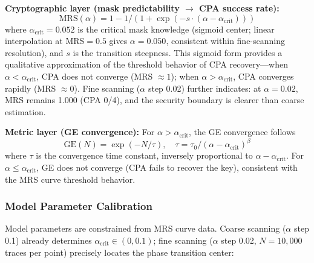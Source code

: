 \documentclass[journal]{IEEEtran}
\begin{document}
\textbf{Cryptographic layer (mask predictability $\rightarrow$ CPA success rate):}
\begin{equation}
\text{MRS}(\alpha) = 1 - 1/(1 + \exp(-s \cdot (\alpha - \alpha_{\text{crit}})))
\end{equation}
where $\alpha_{\text{crit}} = 0.052$ is the critical mask knowledge (sigmoid center; linear interpolation at MRS$=0.5$ gives $\alpha=0.050$, consistent within fine-scanning resolution), and $s$ is the transition steepness. This sigmoid form provides a qualitative approximation of the threshold behavior of CPA recovery---when $\alpha < \alpha_{\text{crit}}$, CPA does not converge (MRS $\approx 1$); when $\alpha > \alpha_{\text{crit}}$, CPA converges rapidly (MRS $\approx 0$). Fine scanning ($\alpha$ step 0.02) further indicates: at $\alpha=0.02$, MRS remains 1.000 (CPA 0/4), and the security boundary is clearer than coarse estimation.

\textbf{Metric layer (GE convergence):} For $\alpha > \alpha_{\text{crit}}$, the GE convergence follows
\begin{equation}
\text{GE}(N) = \exp(-N/\tau), \quad \tau = \tau_0 / (\alpha - \alpha_{\text{crit}})^\beta
\end{equation}
where $\tau$ is the convergence time constant, inversely proportional to $\alpha - \alpha_{\text{crit}}$. For $\alpha \le \alpha_{\text{crit}}$, GE does not converge (CPA fails to recover the key), consistent with the MRS curve threshold behavior.

\subsubsection{Model Parameter Calibration}

Model parameters are constrained from MRS curve data. Coarse scanning ($\alpha$ step 0.1) already determines $\alpha_{\text{crit}} \in (0, 0.1)$; fine scanning ($\alpha$ step 0.02, $N=10{,}000$ traces per point) precisely locates the phase transition center:

\begin{table}[t]
\renewcommand{\arraystretch}{1.1}
\caption{Fine-Scanning MRS and CPA Results}
\label{tab:fine-scan}
\end{table}
\end{document}
